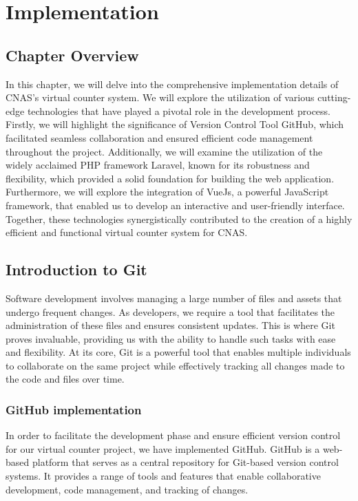\chapter{Implementation}
\section{Chapter Overview}
In this chapter, we will delve into the comprehensive implementation details of CNAS's virtual counter system. We will explore the utilization of various cutting-edge technologies that have played a pivotal role in the development process. Firstly, we will highlight the significance of Version Control Tool GitHub, which facilitated seamless collaboration and ensured efficient code management throughout the project. Additionally, we will examine the utilization of the widely acclaimed PHP framework Laravel, known for its robustness and flexibility, which provided a solid foundation for building the web application. Furthermore, we will explore the integration of VueJs, a powerful JavaScript framework, that enabled us to develop an interactive and user-friendly interface. Together, these technologies synergistically contributed to the creation of a highly efficient and functional virtual counter system for CNAS.
\section{Introduction to Git }
Software development involves managing a large number of files and assets that undergo frequent changes. As developers, we require a tool that facilitates the administration of these files and ensures consistent updates. This is where Git proves invaluable, providing us with the ability to handle such tasks with ease and flexibility. At its core, Git is a powerful tool that enables multiple individuals to collaborate on the same project while effectively tracking all changes made to the code and files over time.
\subsection{GitHub implementation}
In order to facilitate the development phase and ensure efficient version control for our virtual counter project, we have implemented GitHub. GitHub is a web-based platform that serves as a central repository for Git-based version control systems. It provides a range of tools and features that enable collaborative development, code management, and tracking of changes.

